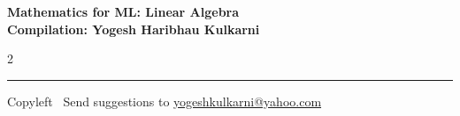 \documentclass[8pt,landscape]{article}
\begin{document}
\footnotesize


\begin{center}
\Large{\textbf{Mathematics for ML: Linear Algebra\\ Compilation: Yogesh Haribhau Kulkarni}}
\end{center}

\begin{multicols}{2}

\end{multicols}

\rule{\linewidth}{0.25pt}
\scriptsize
Copyleft \textcopyleft\  Send suggestions to
\href{http://www.yogeshkulkarni.com}{yogeshkulkarni@yahoo.com}
\end{document}
